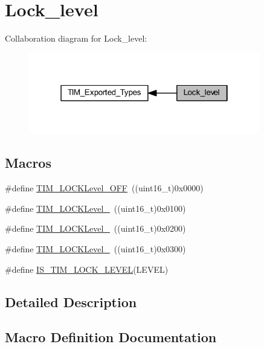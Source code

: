 \hypertarget{group___lock__level}{}\section{Lock\+\_\+level}
\label{group___lock__level}
Collaboration diagram for Lock\+\_\+level\+:
\nopagebreak
\begin{figure}[H]
\begin{center}
\leavevmode
\includegraphics[width=286pt]{group___lock__level}
\end{center}
\end{figure}
\subsection*{Macros}
\begin{DoxyCompactItemize}
\item 
\#define \hyperlink{group___lock__level_ga84d318c62d3e5dfe7082610d03e11f2f}{T\+I\+M\+\_\+\+L\+O\+C\+K\+Level\+\_\+\+O\+FF}~((uint16\+\_\+t)0x0000)
\item 
\#define \hyperlink{group___lock__level_ga7e4326fc7756ebf5e9eb9776c2734aea}{T\+I\+M\+\_\+\+L\+O\+C\+K\+Level\+\_}~((uint16\+\_\+t)0x0100)
\item 
\#define \hyperlink{group___lock__level_ga91bdf218f766e6a10b7a7df407250d25}{T\+I\+M\+\_\+\+L\+O\+C\+K\+Level\+\_}~((uint16\+\_\+t)0x0200)
\item 
\#define \hyperlink{group___lock__level_gaa0a0c1ffd9dc582d6571780c1747920b}{T\+I\+M\+\_\+\+L\+O\+C\+K\+Level\+\_}~((uint16\+\_\+t)0x0300)
\item 
\#define \hyperlink{group___lock__level_gacf5e70717f6d13af301331bb043f5d48}{I\+S\+\_\+\+T\+I\+M\+\_\+\+L\+O\+C\+K\+\_\+\+L\+E\+V\+EL}(L\+E\+V\+EL)
\end{DoxyCompactItemize}


\subsection{Detailed Description}


\subsection{Macro Definition Documentation}
\mbox{\label{group___lock__level_gacf5e70717f6d13af301331bb043f5d48}} 
